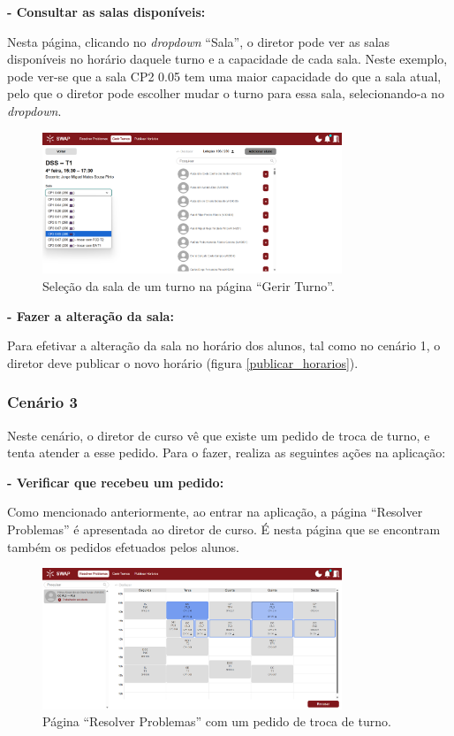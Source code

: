 \documentclass[12pt, a4paper]{article}
\begin{document}
\textbf{- Consultar as salas disponíveis:}

Nesta página, clicando no \emph{dropdown} ``Sala'', o diretor pode ver as salas disponíveis no
horário daquele turno e a capacidade de cada sala. Neste exemplo, pode ver-se que a sala CP2 0.05
tem uma maior capacidade do que a sala atual, pelo que o diretor pode escolher mudar o turno para
essa sala, selecionando-a no \emph{dropdown}.

\begin{figure}[H]
    \centering
    \includegraphics[width=0.8\textwidth]{res/manual/trocar_sala.png}
    \caption{Seleção da sala de um turno na página ``Gerir Turno''.}
    \label{trocar_sala}
\end{figure}

\textbf{- Fazer a alteração da sala:}

Para efetivar a alteração da sala no horário dos alunos, tal como no cenário 1,
o diretor deve publicar o novo horário (figura \ref{publicar_horarios}).

\subsubsection{Cenário 3}

Neste cenário, o diretor de curso vê que existe um pedido de troca de turno, e tenta atender a esse
pedido. Para o fazer, realiza as seguintes ações na aplicação:

\textbf{- Verificar que recebeu um pedido:}

Como mencionado anteriormente, ao entrar na aplicação, a página ``Resolver Problemas'' é apresentada
ao diretor de curso. É nesta página que se encontram também os pedidos efetuados pelos alunos.

\begin{figure}[H]
    \centering
    \includegraphics[width=0.8\textwidth]{res/manual/resolver_troca_turno.png}
    \caption{Página ``Resolver Problemas'' com um pedido de troca de turno.}
    \label{resolver_troca_turno}
\end{figure}
\end{document}
